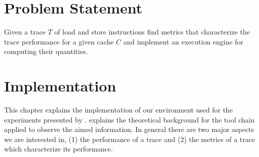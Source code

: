 \documentclass[onecolumn, openright, master, english, signatures]{dbrgrptt}
\begin{document}


\chapter{Problem Statement}\label{cha:problems-tatement}
\begin{definition}
Given a \ac{trace} $T$ of load and store instructions find metrics that characterize the trace performance for a given cache $C$ and implement an execution engine for computing their quantities.
\end{definition}


\chapter{Implementation}\label{cha:implementation}

This chapter explains the implementation of our environment used for the experiments presented by .  explains the theoretical background for the tool chain applied to observe the aimed information. In general there are two major aspects we are interested in, (1) the performance of a \ac{trace} and (2) the metrics of a \ac{trace} which characterize its performance.

\end{document}
